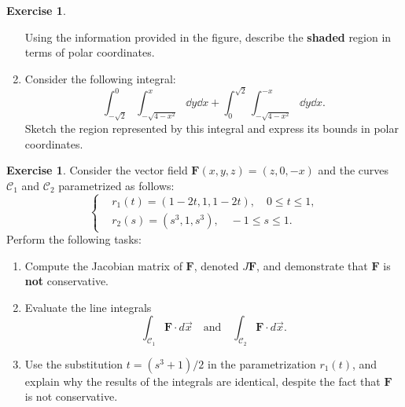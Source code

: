 \documentclass[12pt]{article}
\theoremstyle{plain}
\theoremstyle{definition}
\newtheorem{Ej}[Th]{Exercise}         %
\theoremstyle{remark}
\renewcommand{\leq}{\leqslant}      %
\renewcommand{\:}{\colon}           %
\renewcommand{\.}{\Cdot}                %
\begin{document}
\begin{Ej}
\begin{enumerate}
\begin{center}

  \end{center}
  Using the information provided in the figure, describe the \textbf{shaded} region in terms of polar coordinates.

  \item Consider the following integral:
  \[
  \int_{-\sqrt{2}}^{0}\int_{-\sqrt{4-x^2}}^x\dd y\dd x + \int_{0}^{\sqrt{2}}\int_{-\sqrt{4-x^2}}^{-x}\dd y\dd x.
  \]
  Sketch the region represented by this integral and express its bounds in polar coordinates.
\end{enumerate}
\end{Ej}

\begin{ptcb}
\vspace{15cm}
\end{ptcb}
\newpage
\begin{Ej}
  Consider the vector field $\mathbf{F}(x,y,z) = (z, 0, -x)$ and the curves $\mathcal{C}_1$ and $\mathcal{C}_2$ parametrized as follows:
  \[
  \left\lbrace
  \begin{aligned}
    &r_1(t) = (1-2t, 1, 1-2t),\quad 0 \leq t \leq 1, \\
    &r_2(s) = (s^3, 1, s^3),\quad -1 \leq s \leq 1.
  \end{aligned}
  \right.
  \]
  Perform the following tasks:
  \begin{enumerate}
    \item Compute the Jacobian matrix of $\mathbf{F}$, denoted $J\mathbf{F}$, and demonstrate that $\mathbf{F}$ is \textbf{not} conservative.
    \item Evaluate the line integrals
    \[
    \int_{\mathcal{C}_1} \mathbf{F} \cdot d\vec{x} \quad \text{and} \quad \int_{\mathcal{C}_2} \mathbf{F} \cdot d\vec{x}.
    \]
    \item Use the substitution $t = ({s^3 + 1})/{2}$ in the parametrization $r_1(t)$, and explain why the results of the integrals are identical, despite the fact that $\mathbf{F}$ is not conservative.
  \end{enumerate}
\end{Ej}
\end{document}

